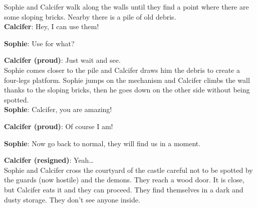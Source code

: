 \noindent Sophie and Calcifer walk along the walls until they find a point where there are some sloping bricks.
Nearby there is a pile of old debris.\\

\textbf{Calcifer}: Hey, I can use them!

\textbf{Sophie}: Use for what?

\textbf{Calcifer (proud)}: Just wait and see.\\

\noindent Sophie comes closer to the pile and Calcifer draws him the debris to create a four-legs platform.
Sophie jumps on the mechanism and Calcifer climbs the wall thanks to the sloping bricks, then he goes down on the other side without being spotted.\\

\textbf{Sophie}: Calcifer, you are amazing!

\textbf{Calcifer (proud)}: Of course I am!

\textbf{Sophie}: Now go back to normal, they will find us in a moment.

\textbf{Calcifer (resigned)}: Yeah…\\

\noindent Sophie and Calcifer cross the courtyard of the castle careful not to be spotted by the guards (now hostile) and the demons.
They reach a wood door. It is close, but Calcifer eats it and they can proceed. They find themselves in a dark and dusty storage. They don’t see anyone inside.\\

